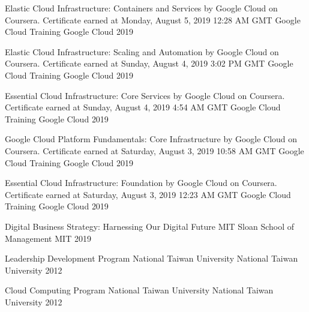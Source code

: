 

\begin{cvhonors}

  \cvhonor
    {Elastic Cloud Infrastructure: Containers and Services by Google Cloud on Coursera. Certificate earned at Monday, August 5, 2019 12:28 AM GMT} %
    {Google Cloud Training} %
    {Google Cloud} %
    {2019} %

  \cvhonor
    {Elastic Cloud Infrastructure: Scaling and Automation by Google Cloud on Coursera. Certificate earned at Sunday, August 4, 2019 3:02 PM GMT} %
    {Google Cloud Training} %
    {Google Cloud} %
    {2019} %

  \cvhonor
    {Essential Cloud Infrastructure: Core Services by Google Cloud on Coursera. Certificate earned at Sunday, August 4, 2019 4:54 AM GMT} %
    {Google Cloud Training} %
    {Google Cloud} %
    {2019} %

  \cvhonor
    {Google Cloud Platform Fundamentals: Core Infrastructure by Google Cloud on Coursera. Certificate earned at Saturday, August 3, 2019 10:58 AM GMT} %
    {Google Cloud Training} %
    {Google Cloud} %
    {2019} %

  \cvhonor
    {Essential Cloud Infrastructure: Foundation by Google Cloud on Coursera. Certificate earned at Saturday, August 3, 2019 12:23 AM GMT} %
    {Google Cloud Training} %
    {Google Cloud} %
    {2019} %

  \cvhonor
    {Digital Business Strategy: Harnessing Our Digital Future} %
    {MIT Sloan School of Management} %
    {MIT} %
    {2019} %

  \cvhonor
    {Leadership Development Program} %
    {National Taiwan University} %
    {National Taiwan University} %
    {2012} %

  \cvhonor
    {Cloud Computing Program} %
    {National Taiwan University} %
    {National Taiwan University} %
    {2012} %

\end{cvhonors}
